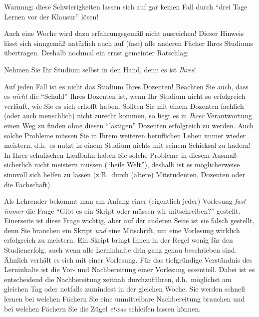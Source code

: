 \begin{center}
\large Warnung:  diese Schwierigkeiten lassen sich auf gar keinen Fall durch 
"`drei Tage Lernen vor der Klausur"' lösen!
\end{center}

Auch eine Woche wird dazu erfahrungsgemäß nicht ausreichen! Dieser
Hinweis lässt sich sinngemäß natürlich auch auf (fast) alle anderen
Fächer Ihres Studiums übertragen. Deshalb nochmal ein ernst gemeinter Ratschlag:
\begin{center}
	\large Nehmen Sie Ihr Studium selbst in den Hand, denn es ist \emph{Ihres}!
\end{center}
Auf jeden Fall ist es nicht das Studium Ihres Dozenten! Beachten Sie auch, dass es 
\emph{nicht} die "`Schuld"' Ihres Dozenten ist, wenn Ihr Studium nicht so erfolgreich
verläuft, wie Sie es sich erhofft haben. Sollten Sie mit einem Dozenten fachlich (oder 
auch menschlich) nicht zurecht kommen, so liegt es in \emph{Ihrer} Verantwortung einen Weg
zu finden ohne diesen "`lästigen"' Dozenten erfolgreich zu werden. Auch solche 
Probleme müssen Sie in Ihrem weiteren beruflichen Leben immer wieder meistern, d.h.~es nutzt
in einem Studium nichts mit seinem Schicksal zu hadern! In Ihrer schulischen Laufbahn
haben Sie solche Probleme in diesem Ausmaß sicherlich nicht meistern müssen ("`heile Welt"'), 
deshalb ist es möglicherweise sinnvoll sich helfen zu lassen (z.B.~durch (ältere) Mitstudenten, 
Dozenten oder die Fachschaft).

\goodbreak
\bigskip

Als Lehrender bekommt man am Anfang einer (eigentlich jeder) Vorlesung \emph{fast immer} die 
Frage "`Gibt es ein Skript oder müssen wir mitschreiben?"' gestellt. Einerseits ist diese Frage
wichtig, aber auf der anderen Seite ist sie falsch gestellt, denn Sie brauchen ein Skript
\emph{und} eine Mitschrift, um eine Vorlesung wirklich erfolgreich zu meistern. Ein Skript 
bringt Ihnen in der Regel wenig für den Studienerfolg, auch wenn alle Lerninhalte drin ganz genau 
beschrieben sind. Ähnlich verhält es sich mit einer Vorlesung. Für das tiefgründige Verständnis des 
Lerninhalts ist die Vor- und Nachbereitung einer Vorlesung essentiell. Dabei ist es entscheidend die
Nachbereitung zeitnah durchzuführen, d.h.~möglichst am gleichen Tag oder notfalls
zumindest in der gleichen Woche. Sie werden schnell lernen bei welchen Fächern Sie eine
unmittelbare Nachbereitung brauchen und bei welchen Fächern Sie die Zügel 
\emph{etwas} schleifen lassen können.

